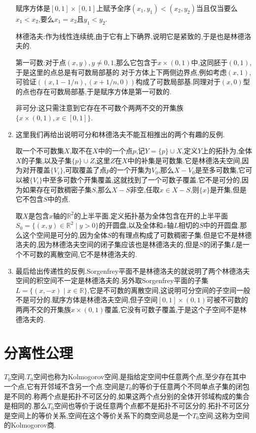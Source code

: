 \begin{enumerate}
    赋序方体是$[0,1]\times[0,1]$上赋予全序$(x_1,y_1)<(x_2,y_2)$当且仅当要么$x_1<x_2$,要么$x_1=x_2$且$y_1<y_2$.
    
    林德洛夫:作为线性连续统,由于它有上下确界,说明它是紧致的,于是也是林德洛夫的.
    
    第一可数:对于点$(x,y),y\not=0,1$,那么它包含于$x\times(0,1)$中,这同胚于$(0,1)$,于是这里的点总是有可数局部基的.对于方体上下两侧边界点,例如考虑$(x,1)$,可验证$((x,1-1/n),(x+1/n,0))$构成了可数局部基.同理对于$(x,0)$型的点也存在可数局部基,于是赋序方体是第一可数的.
    
    非可分:这只需注意到它存在不可数个两两不交的开集族$\{x\times(0,1),x\in[0,1]\}$.
    \item 这里我们再给出说明可分和林德洛夫不能互相推出的两个有趣的反例.
    
    取一个不可数集$X$,取不在$X$中的一个点$p$,记$Y=\{p\}\cup X$,定义$Y$上的拓扑为,全体$X$的子集,以及子集$\{p\}\cup Z$,这里$Z$在$X$中的补集是可数集.它是林德洛夫空间,因为对开覆盖$\{V_i\}$,可取覆盖了点$p$的一个开集为$V_0$,那么$X-V_0$是至多可数集,它可以被$\{V_i\}$中至多可数个开集覆盖,这就找到了一个可数子覆盖.它不是可分的,因为如果存在可数稠密子集$S$,那么$X-S$非空,任取$x\in X-S$,则$\{x\}$是开集,但是它不包含$S$中的点.
    
    取$X$是包含$x$轴的$\mathbb{R}^2$的上半平面.定义拓扑基为全体包含在开的上半平面$S_0=\{(x,y)\in\mathbb{R}^2\mid y>0\}$的开圆盘,以及全体和$x$轴$L$相切的$S$中的开圆盘.那么这个空间是可分的,因为全体$S$的有理点构成了可数稠密子集.但是它不是林德洛夫的,因为林德洛夫空间的闭子集应该也是林德洛夫的,但是$S$的闭子集$L$是一个不可数的离散空间,它不是林德洛夫的.
    \item 最后给出传递性的反例.Sorgenfrey平面不是林德洛夫的就说明了两个林德洛夫空间的积空间不一定是林德洛夫的.另外取Sorgenfrey平面的子集$L=\{(x,-x)\mid x\in\mathbb{R}\}$,它是不可数的离散空间,这说明可分空间的子空间一般不是可分的.赋序方体是林德洛夫空间,但子空间$[0,1]\times(0,1)$可被不可数的两两不交的开集族$x\times(0,1)$覆盖,它没有可数子覆盖,于是这个子空间不是林德洛夫的.
\end{enumerate}
\newpage
\section{分离性公理}

$T_0$空间.$T_0$空间也称为Kolmogorov空间,是指给定空间中任意两个点,至少存在其中一个点,它有开邻域不含另一个点.空间是$T_0$的等价于任意两个不同单点子集的闭包是不同的.称两个点是拓扑不可区分的,如果这两个点分别的全体开邻域构成的集合是相同的.那么$T_0$空间也等价于说任意两个点都不是拓扑不可区分的.拓扑不可区分是空间上的等价关系,空间在这个等价关系下的商空间总是一个$T_0$空间,这称为空间的Kolmogorov商.

